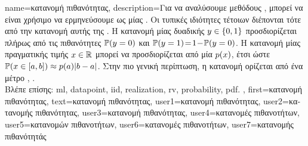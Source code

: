{name={\foreignlanguage{greek}{κατανομή πιθανότητας}},
	description={\foreignlanguage{greek}{Για να αναλύσουμε μεθόδους} 
		, \foreignlanguage{greek}{μπορεί να είναι χρήσιμο να ερμηνεύσουμε}  \foreignlanguage{greek}{ως} 
		  \foreignlanguage{greek}{μίας} . \foreignlanguage{greek}{Οι τυπικές  
		ιδιότητες τέτοιων}  \foreignlanguage{greek}{διέπονται τότε από την κατανομή}   
		\foreignlanguage{greek}{αυτής της} . \foreignlanguage{greek}{Η κατανομή}  
		\foreignlanguage{greek}{μίας δυαδικής}  $y \in \{0,1\}$ \foreignlanguage{greek}{προσδιορίζεται πλήρως
		από τις πιθανότητες $\mathbb{P}({y = 0})$ και 
		$\mathbb{P}({y=1})\!=\!1\!-\!\mathbb{P}({y=0})$. Η κατανομή}  
		\foreignlanguage{greek}{μίας}  \foreignlanguage{greek}{πραγματικής τιμής $x \in \mathbb{R}$ μπορεί να 
		προσδιορίζεται από μία}  $p(x)$, \foreignlanguage{greek}{έτσι ώστε $\mathbb{P}({ x \in [a,b] }) \approx  p(a) |b-a|$. 
	    	Στην πιο γενική περίπτωση, η κατανομή}  \foreignlanguage{greek}{ορίζεται από ένα μέτρο} 
		 \cite{BillingsleyProbMeasure}, \cite{GrayProbBook}.\\
	    	\foreignlanguage{greek}{Βλέπε επίσης:} \gls{ml}, \gls{datapoint}, \gls{iid}, \gls{realization}, \gls{rv}, \gls{probability}, \gls{pdf}. },
	 first={\foreignlanguage{greek}{κατανομή πιθανότητας}},
	 text={\foreignlanguage{greek}{κατανομή πιθανότητας}},
	 user1={\foreignlanguage{greek}{κατανομή πιθανότητας}}, %
	 user2={\foreignlanguage{greek}{κατανομής πιθανότητας}}, %
	 user3={\foreignlanguage{greek}{κατανομή πιθανότητας}}, %
	 user4={\foreignlanguage{greek}{κατανομές πιθανοτήτων}}, %
	 user5={\foreignlanguage{greek}{κατανομών πιθανοτήτων}}, %
	 user6={\foreignlanguage{greek}{κατανομές πιθανοτήτων}}, %
	 user7={\foreignlanguage{greek}{κατανομής πιθανότητάς}} %
}

